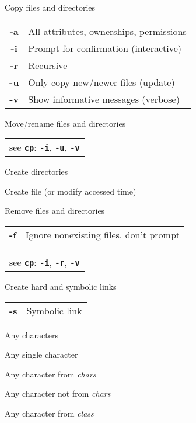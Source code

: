 \documentclass[12pt, a4paper]
{article}
\begin{document}
\begin{multicols}{3}

\begin{description}[nolistsep]
	\item[cp] Copy files and directories
	\item
	\begin{tabular}{cl}
		{\large \ttfamily \textbf{-a}} & All attributes, ownerships, permissions \\
		{\large \ttfamily \textbf{-i}} & Prompt for confirmation (interactive)\\
		{\large \ttfamily \textbf{-r}} & Recursive \\
		{\large \ttfamily \textbf{-u}} & Only copy new/newer files (update) \\
		{\large \ttfamily \textbf{-v}} & Show informative messages (verbose)\\
	\end{tabular}
	\item[mv] Move/rename files and directories
	\item
	\begin{tabular}{l}
		see \texttt{\textbf{cp}}: \texttt{\textbf{-i}}, \texttt{\textbf{-u}}, \texttt{\textbf{-v}}
	\end{tabular}
	\item[mkdir] Create directories
	\item[touch] Create file (or modify accessed time)
	\item[rm] Remove files and directories
	\item
	\begin{tabular}{cl}
		{\large \ttfamily \textbf{-f}} & Ignore nonexisting files, don't prompt
	\end{tabular}
	\item
	\begin{tabular}{l}
		see \texttt{\textbf{cp}}: \texttt{\textbf{-i}}, \texttt{\textbf{-r}}, \texttt{\textbf{-v}}
	\end{tabular}
	\item[ln] Create hard and symbolic links
	\item
	\begin{tabular}{cl}
		{\large \ttfamily \textbf{-s}} & Symbolic link
	\end{tabular}
\end{description}


\begin{description}[nolistsep]
	\item[*] Any characters
	\item[?] Any single character
	\item[{[\large \textit{chars}}{\Large]}] Any character from \textit{chars}
	\item[{[\large!\textit{chars}}{\Large]}] Any character not from \textit{chars}
	\item[{[\large:\textit{class}:}{\Large]}] Any character from \textit{class}
\end{description}


\end{multicols}
\end{document}
